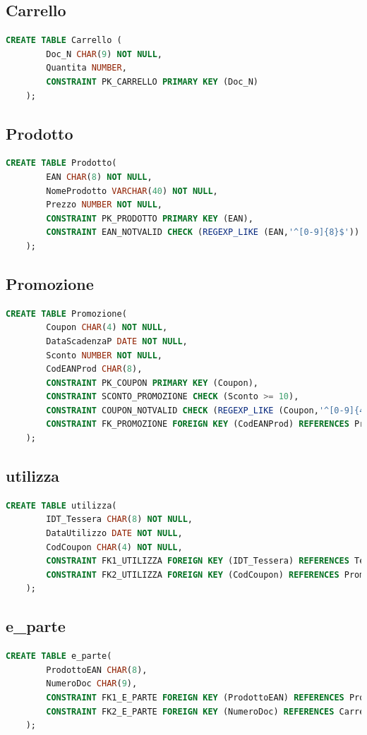 \documentclass[12pt]{report}
\begin{document}
\subsection*{Carrello}\begin{lstlisting}[language=SQL]
    CREATE TABLE Carrello (
        Doc_N CHAR(9) NOT NULL,
        Quantita NUMBER,
        CONSTRAINT PK_CARRELLO PRIMARY KEY (Doc_N)
    );   
\end{lstlisting}

\subsection*{Prodotto}\begin{lstlisting}[language=SQL]
    CREATE TABLE Prodotto(
        EAN CHAR(8) NOT NULL,
        NomeProdotto VARCHAR(40) NOT NULL,
        Prezzo NUMBER NOT NULL,
        CONSTRAINT PK_PRODOTTO PRIMARY KEY (EAN),
        CONSTRAINT EAN_NOTVALID CHECK (REGEXP_LIKE (EAN,'^[0-9]{8}$'))
    );
\end{lstlisting}

\subsection*{Promozione}
\begin{lstlisting}[language=SQL]
    CREATE TABLE Promozione(
        Coupon CHAR(4) NOT NULL,
        DataScadenzaP DATE NOT NULL,
        Sconto NUMBER NOT NULL,
        CodEANProd CHAR(8),
        CONSTRAINT PK_COUPON PRIMARY KEY (Coupon),
        CONSTRAINT SCONTO_PROMOZIONE CHECK (Sconto >= 10),
        CONSTRAINT COUPON_NOTVALID CHECK (REGEXP_LIKE (Coupon,'^[0-9]{4}$')),
        CONSTRAINT FK_PROMOZIONE FOREIGN KEY (CodEANProd) REFERENCES Prodotto(EAN)
    );
\end{lstlisting}

\newpage

\subsection*{utilizza}\begin{lstlisting}[language=SQL]
    CREATE TABLE utilizza(
		IDT_Tessera CHAR(8) NOT NULL,
		DataUtilizzo DATE NOT NULL,
		CodCoupon CHAR(4) NOT NULL,
		CONSTRAINT FK1_UTILIZZA FOREIGN KEY (IDT_Tessera) REFERENCES Tessera(IDT),
		CONSTRAINT FK2_UTILIZZA FOREIGN KEY (CodCoupon) REFERENCES Promozione(Coupon)
	);
\end{lstlisting}

\subsection*{e\_parte}\begin{lstlisting}[language=SQL]
    CREATE TABLE e_parte(
		ProdottoEAN CHAR(8),
		NumeroDoc CHAR(9),
		CONSTRAINT FK1_E_PARTE FOREIGN KEY (ProdottoEAN) REFERENCES Prodotto(EAN),
		CONSTRAINT FK2_E_PARTE FOREIGN KEY (NumeroDoc) REFERENCES Carrello(Doc_N)
	);
\end{lstlisting}
\end{document}
